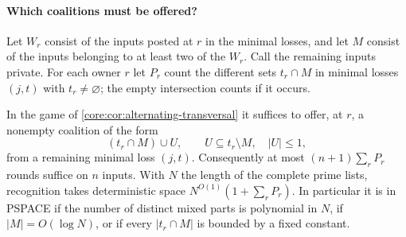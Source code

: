 \paragraph{Which coalitions must be offered?}
Let $W_r$ consist of the inputs posted at $r$ in the minimal losses,
and let $M$ consist of the inputs belonging to at least two of the
$W_r$. Call the remaining inputs private. For each owner $r$ let
$P_r$ count the different sets $t_r\cap M$ in minimal losses
$(j,t)$ with $t_r\ne\varnothing$; the empty intersection counts if
it occurs.

\begin{theorem}
\label{core:thm:mixed-part-offers}
In the game of \cref{core:cor:alternating-transversal} it suffices
to offer, at $r$, a nonempty coalition of the form
\[
                 (t_r\cap M)\cup U,\qquad
                 U\subseteq t_r\setminus M,\quad |U|\le1,
\]
from a remaining minimal loss $(j,t)$. Consequently at most
$(n+1)\sum_rP_r$ rounds suffice on $n$ inputs. With $N$ the length
of the complete prime lists, recognition takes deterministic space
$N^{O(1)}(1+\sum_r P_r)$. In particular it is in PSPACE if the
number of distinct mixed parts is polynomial in $N$, if
$|M|=O(\log N)$, or if every $|t_r\cap M|$ is bounded by a fixed
constant.
\end{theorem}
